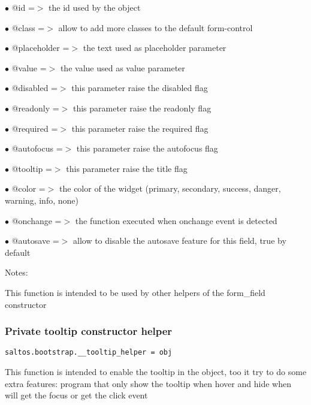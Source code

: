 \documentclass[a4paper]{article}
\begin{document}
\begin{compactitem}
\item[\color{myblue}$\bullet$] @id          =$>$ the id used by the object
\item[\color{myblue}$\bullet$] @class       =$>$ allow to add more classes to the default form-control
\item[\color{myblue}$\bullet$] @placeholder =$>$ the text used as placeholder parameter
\item[\color{myblue}$\bullet$] @value       =$>$ the value used as value parameter
\item[\color{myblue}$\bullet$] @disabled    =$>$ this parameter raise the disabled flag
\item[\color{myblue}$\bullet$] @readonly    =$>$ this parameter raise the readonly flag
\item[\color{myblue}$\bullet$] @required    =$>$ this parameter raise the required flag
\item[\color{myblue}$\bullet$] @autofocus   =$>$ this parameter raise the autofocus flag
\item[\color{myblue}$\bullet$] @tooltip     =$>$ this parameter raise the title flag
\item[\color{myblue}$\bullet$] @color       =$>$ the color of the widget (primary, secondary, success, danger, warning, info, none)
\item[\color{myblue}$\bullet$] @onchange    =$>$ the function executed when onchange event is detected
\item[\color{myblue}$\bullet$] @autosave    =$>$ allow to disable the autosave feature for this field, true by default
\end{compactitem}

Notes:

This function is intended to be used by other helpers of the form\_field constructor

\hypertarget{toc653}{}
\subsubsection{Private tooltip constructor helper}

\begin{lstlisting}
saltos.bootstrap.__tooltip_helper = obj
\end{lstlisting}

This function is intended to enable the tooltip in the object, too it try to do some
extra features: program that only show the tooltip when hover and hide when will get
the focus or get the click event
\end{document}
